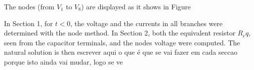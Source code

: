 \par The nodes (from $V_1$ to $V_8$) are displayed as it shows in Figure %

\par In Section 1, for $t < 0$, the voltage and the currents in all branches were determined with the node method. In Section 2, both the equivalent resistor $R_eq$, seen from the capacitor terminals, and the nodes voltage were computed. The natural solution is then 
escrever aqui o que é que se vai fazer em cada seccao porque isto ainda vai mudar, logo se ve



















